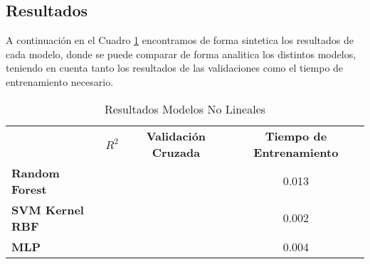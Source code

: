 \subsection{Resultados}

A continuación en el Cuadro \ref{Modelos-No-Lineales-Resultados} encontramos de forma sintetica los resultados de cada modelo, donde se puede comparar de forma analitica los distintos modelos, teniendo en cuenta tanto los resultados de las validaciones como el tiempo de entrenamiento necesario. 

\begin{table}[h]
    \centering
    \begin{tabular}{lccc}
                                        & \textbf{$R^2$} & \textbf{Validación Cruzada}  & \textbf{Tiempo de Entrenamiento} \\
        \textbf{Random Forest}          &           &                   & 0.013 \\
        \textbf{SVM Kernel RBF}         &           &                   & 0.002 \\
        \textbf{MLP}                    &           &                   & 0.004
    \end{tabular}
    \caption{Resultados Modelos No Lineales}
    \label{Modelos-No-Lineales-Resultados}
\end{table}